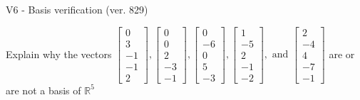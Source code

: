 \begin{exercise}
  \begin{exerciseTitle}V6 - Basis verification (ver. 829)\end{exerciseTitle}
  \begin{exerciseStatement}
    Explain why the vectors \(\left[\begin{array}{r}
0 \\
3 \\
-1 \\
-1 \\
2
\end{array}\right] , \left[\begin{array}{r}
0 \\
0 \\
2 \\
-3 \\
-1
\end{array}\right] , \left[\begin{array}{r}
0 \\
-6 \\
0 \\
5 \\
-3
\end{array}\right] , \left[\begin{array}{r}
1 \\
-5 \\
2 \\
-1 \\
-2
\end{array}\right] , \text{ and } \left[\begin{array}{r}
2 \\
-4 \\
4 \\
-7 \\
-1
\end{array}\right]\) are or are not a basis of \(\mathbb{R}^5\)	



\end{exerciseStatement}
\end{exercise}
